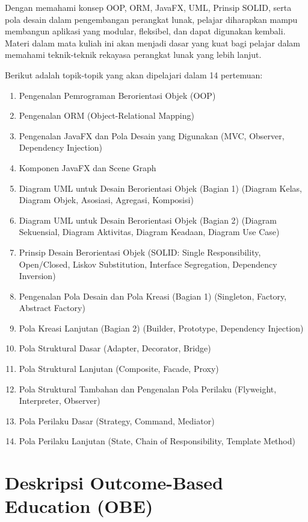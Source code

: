 Dengan memahami konsep OOP, ORM, JavaFX, UML, Prinsip SOLID, serta pola desain dalam pengembangan perangkat lunak, pelajar diharapkan mampu membangun aplikasi yang modular, fleksibel, dan dapat digunakan kembali. Materi dalam mata kuliah ini akan menjadi dasar yang kuat bagi pelajar dalam memahami teknik-teknik rekayasa perangkat lunak yang lebih lanjut. 

Berikut adalah topik-topik yang akan dipelajari dalam 14 pertemuan:

\begin{enumerate}
	\item Pengenalan Pemrograman Berorientasi Objek (OOP)
	\item Pengenalan ORM (Object-Relational Mapping)
	\item Pengenalan JavaFX dan Pola Desain yang Digunakan (MVC, Observer, Dependency Injection)
	\item Komponen JavaFX dan Scene Graph
	\item Diagram UML untuk Desain Berorientasi Objek (Bagian 1) (Diagram Kelas, Diagram Objek, Asosiasi, Agregasi, Komposisi)
	\item Diagram UML untuk Desain Berorientasi Objek (Bagian 2) (Diagram Sekuensial, Diagram Aktivitas, Diagram Keadaan, Diagram Use Case)
	\item Prinsip Desain Berorientasi Objek (SOLID: Single Responsibility, Open/Closed, Liskov Substitution, Interface Segregation, Dependency Inversion)
	\item Pengenalan Pola Desain dan Pola Kreasi (Bagian 1) (Singleton, Factory, Abstract Factory)
	\item Pola Kreasi Lanjutan (Bagian 2) (Builder, Prototype, Dependency Injection)
	\item Pola Struktural Dasar (Adapter, Decorator, Bridge)
	\item Pola Struktural Lanjutan (Composite, Facade, Proxy)
	\item Pola Struktural Tambahan dan Pengenalan Pola Perilaku (Flyweight, Interpreter, Observer)
	\item Pola Perilaku Dasar (Strategy, Command, Mediator)
	\item Pola Perilaku Lanjutan (State, Chain of Responsibility, Template Method)
\end{enumerate}



\section{Deskripsi Outcome-Based Education (OBE)}

